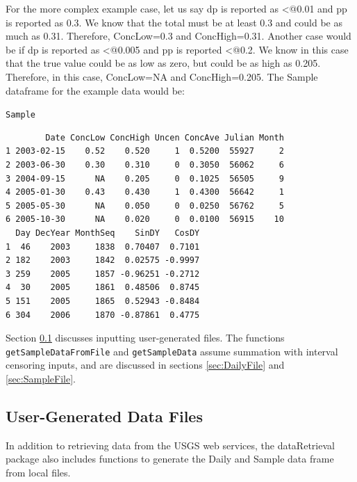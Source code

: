 \documentclass[a4paper,11pt]{article}\usepackage[]{graphicx}\usepackage[]{color}
\makeatletter
\newcommand{\hlstd}[1]{\textcolor[rgb]{0.345,0.345,0.345}{#1}}%
\newenvironment{kframe}{%
 \def\at@end@of@kframe{}%
 \ifinner\ifhmode%
  \def\at@end@of@kframe{\end{minipage}}%
  \begin{minipage}{\columnwidth}%
 \fi\fi%
 \def\FrameCommand##1{\hskip\@totalleftmargin \hskip-\fboxsep
 \colorbox{shadecolor}{##1}\hskip-\fboxsep
     \hskip-\linewidth \hskip-\@totalleftmargin \hskip\columnwidth}%
 \MakeFramed {\advance\hsize-\width
   \@totalleftmargin\z@ \linewidth\hsize
   \@setminipage}}%
 {\par\unskip\endMakeFramed%
 \at@end@of@kframe}
\newenvironment{knitrout}{}{} %
\makeatother
\begin{document}
For the more complex example case, let us say dp is reported as \verb@<@0.01 and pp is reported as 0.3. We know that the total must be at least 0.3 and could be as much as 0.31. Therefore, ConcLow=0.3 and ConcHigh=0.31. Another case would be if dp is reported as \verb@<@0.005 and pp is reported \verb@<@0.2. We know in this case that the true value could be as low as zero, but could be as high as 0.205. Therefore, in this case, ConcLow=NA and ConcHigh=0.205. The Sample dataframe for the example data would be:



\begin{knitrout}
\color{fgcolor}\begin{kframe}
\begin{alltt}
  \hlstd{Sample}
\end{alltt}
\begin{verbatim}
        Date ConcLow ConcHigh Uncen ConcAve Julian Month
1 2003-02-15    0.52    0.520     1  0.5200  55927     2
2 2003-06-30    0.30    0.310     0  0.3050  56062     6
3 2004-09-15      NA    0.205     0  0.1025  56505     9
4 2005-01-30    0.43    0.430     1  0.4300  56642     1
5 2005-05-30      NA    0.050     0  0.0250  56762     5
6 2005-10-30      NA    0.020     0  0.0100  56915    10
  Day DecYear MonthSeq    SinDY   CosDY
1  46    2003     1838  0.70407  0.7101
2 182    2003     1842  0.02575 -0.9997
3 259    2005     1857 -0.96251 -0.2712
4  30    2005     1861  0.48506  0.8745
5 151    2005     1865  0.52943 -0.8484
6 304    2006     1870 -0.87861  0.4775
\end{verbatim}
\end{kframe}
\end{knitrout}

Section \ref{sec:userFiles} discusses inputting user-generated files. The functions \texttt{getSampleDataFromFile} and \texttt{getSampleData} assume summation with interval censoring inputs, and are discussed in sections \ref{sec:DailyFile} and \ref{sec:SampleFile}.

\FloatBarrier

\subsection{User-Generated Data Files}
\label{sec:userFiles}
In addition to retrieving data from the USGS web services, the dataRetrieval package also includes functions to generate the Daily and Sample data frame from local files.
\end{document}
